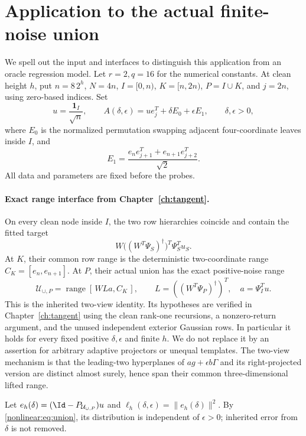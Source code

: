 \documentclass[11pt,oneside,openany,a4paper]{book}
\numberwithin{equation}{chapter}
\theoremstyle{definition}
\theoremstyle{remark}
\DeclareMathOperator{\ran}{range}\DeclareMathOperator{\OPT}{OPT}
\begin{document}
\section{Application to the actual finite-noise union}\label{nonlinear:sec:application}
We spell out the input and interfaces to distinguish this application from an oracle regression model. Let $r=2,q=16$ for the numerical constants. At clean height $h$, put $n=8\,2^h$, $N=4n$, $I=[0,n)$, $K=[n,2n)$, $P=I\cup K$, and $j=2n$, using zero-based indices. Set
\[
 u=\frac{\mathbf1_I}{\sqrt n},\qquad
 A(\delta,\epsilon)=ue_j^T+\delta E_0+\epsilon E_1,\qquad \delta,\epsilon>0,
\]
where $E_0$ is the normalized permutation swapping adjacent four-coordinate leaves inside $I$, and
\[
 E_1=\frac{e_ne_{j+1}^T+e_{n+1}e_{j+2}^T}{\sqrt2}.
\]
All data and parameters are fixed before the probes.

\paragraph{Exact range interface from Chapter~\ref{ch:tangent}.}
On every clean node inside $I$, the two row hierarchies coincide and contain the fitted target
\[
 W\bigl((W^T\Psi_S)^\dagger\bigr)^T\Psi_S^Tu_S.
\]
At $K$, their common row range is the deterministic two-coordinate range $C_K=[e_n,e_{n+1}]$. At $P$, their actual union has the exact positive-noise range
\begin{equation}\label{nonlinear:eq:union}
 \mathcal U_{\cup,P}=\ran[\,WLa,C_K\,],\qquad
 L=((W^T\Psi_P)^\dagger)^T,\quad a=\Psi_I^Tu.
\end{equation}
This is the inherited two-view identity. Its hypotheses are verified in Chapter~\ref{ch:tangent} using the clean rank-one recursions, a nonzero-return argument, and the unused independent exterior Gaussian rows. In particular it holds for every fixed positive $\delta,\epsilon$ and finite $h$. We do not replace it by an assertion for arbitrary adaptive projectors or unequal templates. The two-view mechanism is that the leading-two hyperplanes of $ag+\epsilon b\Gamma$ and its right-projected version are distinct almost surely, hence span their common three-dimensional lifted range.

Let $e_h(\delta)=(\Id-P_{\mathcal U_{\cup,P}})u$ and $\ell_h(\delta,\epsilon)=\|e_h(\delta)\|^2$. By \eqref{nonlinear:eq:union}, its distribution is independent of $\epsilon>0$; inherited error from $\delta$ is not removed.
\end{document}
